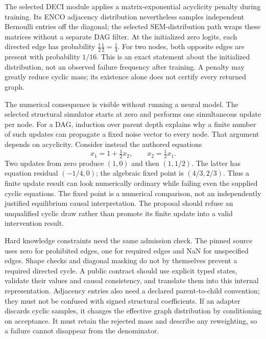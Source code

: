 The selected DECI module applies a matrix-exponential acyclicity penalty during
training. Its ENCO adjacency distribution nevertheless samples independent
Bernoulli entries off the diagonal; the selected SEM-distribution path wraps
these matrices without a separate DAG filter. At the initialized zero logits,
each directed edge has probability \(\tfrac12\tfrac12=\tfrac14\).
For two nodes, both opposite edges are present with probability
\(1/16\). This is an exact statement about the initialized distribution,
not an observed failure frequency after training. A penalty may greatly
reduce cyclic mass; its existence alone does not certify every returned
graph. \citep{exec14_causica_primary,exec14_causica_exact}

The numerical consequence is visible without running a neural model.
The selected structural simulator starts at zero and performs one simultaneous
update per node. For a DAG, induction over parent depth explains why a finite
number of such updates can propagate a fixed noise vector to every node.
That argument depends on acyclicity. Consider instead the authored equations
\[
        x_1=1+\tfrac12x_2,\qquad x_2=\tfrac12x_1.
\]
Two updates from zero produce \((1,0)\) and then \((1,1/2)\).
The latter has equation residual \((-1/4,0)\); the algebraic fixed point is
\((4/3,2/3)\). Thus a finite update result can look numerically ordinary while
failing even the supplied cyclic equations. The fixed point is a numerical
comparison, not an independently justified equilibrium causal interpretation.
The proposal should refuse an unqualified cyclic draw rather than promote
its finite update into a valid intervention result.
\citep{exec14_causica_primary,exec14_causica_exact}

Hard knowledge constraints need the same admission check. The pinned source
uses zero for prohibited edges, one for required edges and NaN for unspecified
edges. Shape checks and diagonal masking do not by themselves prevent a
required directed cycle. A public contract should use explicit typed states,
validate their values and causal consistency, and translate them into this
internal representation. Adjacency entries also need a declared
parent-to-child convention; they must not be confused with signed structural
coefficients. If an adapter discards cyclic samples, it changes the effective
graph distribution by conditioning on acceptance. It must retain the rejected
mass and describe any reweighting, so a failure cannot disappear from the
denominator. \citep{exec14_causica_primary,exec14_causica_decision}


